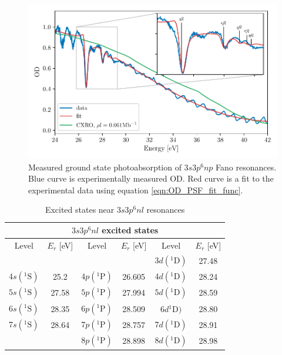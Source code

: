 \begin{figure}
	\centering
	\includegraphics[width=1.0\textwidth]{figures/ATS/fano_fit.pdf}
	\caption{Measured ground state photoabsorption of $3s3p^6np$ Fano resonances.  Blue curve is experimentally measured OD.  Red curve is a fit to the experimental data using equation \ref{eqn:OD_PSF_fit_func}.}
	\label{fig:fano_fit}
\end{figure}


\begin{table}[]
	\centering
	\begin{tabular}{|cc|cc|cc|}
		\hline \hline
		\multicolumn{6}{|c|}{$3s3p^6nl$ excited states}                                               \\ \hline
		Level        & $E_r$ {[}eV{]} & Level        & $E_r$ {[}eV{]} & Level        & $E_r$ {[}eV{]} \\ \hline
		&                &              &                & $3d({}^1\mathrm{D})$ & 27.48          \\
		$4s( {}^1\mathrm{S})$ & 25.2           & $4p({}^1\mathrm{P})$ & 26.605         & $4d({}^1\mathrm{D})$   & 28.24          \\
		$5s( {}^1\mathrm{S})$ & 27.58          & $5p({}^1\mathrm{P})$ & 27.994         & $5d({}^1\mathrm{D})$ & 28.59          \\
		$6s( {}^1\mathrm{S})$ & 28.35          & $6p({}^1\mathrm{P})$ & 28.509         & $6d{}^1\mathrm{D})$ & 28.80          \\
		$7s( {}^1\mathrm{S})$ & 28.64          & $7p({}^1\mathrm{P})$ & 28.757         & $7d({}^1\mathrm{D})$   & 28.91          \\
		&                & $8p({}^1\mathrm{P})$ & 28.898         & $8d({}^1\mathrm{D})$ & 28.98          \\ \hline \hline
	\end{tabular}
	\caption{Excited states near $3s3p^6nl$ resonances}
	\label{tab:all_states}
\end{table}

